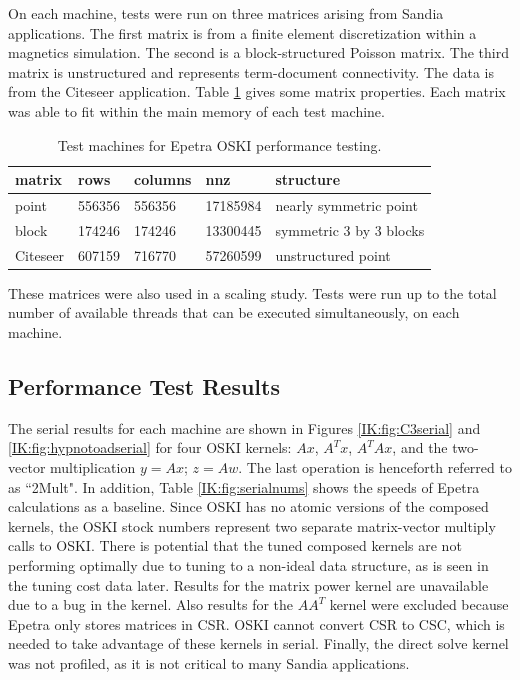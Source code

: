On each machine, tests were run on three matrices arising from Sandia applications.
The first matrix is from a finite element discretization within a magnetics simulation.
The second is a block-structured Poisson matrix.  The third matrix
is unstructured and represents term-document connectivity.  The data is from the Citeseer
application.
Table \ref{IK:fig:serialmats} gives some matrix properties.  Each
matrix was able to fit within the main memory of each test machine.
%
\begin{table}[htbp]
\begin{center}
\begin{tabular}{|l|l|l|l|l|}
\hline
matrix & rows & columns & nnz & structure \\
\hline
point & 556356 & 556356 & 17185984 & nearly symmetric point \\
block & 174246 & 174246 & 13300445 & symmetric 3 by 3 blocks \\
Citeseer & 607159 & 716770 & 57260599 & unstructured point \\
\hline
\end{tabular}
\caption{Test machines for Epetra OSKI performance testing.}
\label{IK:fig:serialmats}
\end{center}
\end{table}
%
These matrices were also used in a scaling study.   Tests were run up to the total
number of available threads that can be executed simultaneously, on each machine.

\subsection{Performance Test Results}

The serial results for each machine are shown in
Figures \ref{IK:fig:C3serial} and \ref{IK:fig:hypnotoadserial} for four OSKI kernels:
$Ax$, $A^Tx$, $A^{T}Ax$, and the two-vector multiplication $y=Ax$; $z=Aw$.  The last operation is henceforth referred to as ``2Mult".
In addition, Table \ref{IK:fig:serialnums} shows the speeds of Epetra calculations as a baseline.
Since OSKI has no atomic versions of the composed kernels, the OSKI stock numbers
represent two separate matrix-vector multiply calls to OSKI.  There is potential that
the tuned composed kernels are not performing optimally due to tuning to a non-ideal data structure,
as is seen in the tuning cost data later.  Results for the matrix power kernel are unavailable
due to a bug in the kernel.  Also results for the $AA^T$ kernel were excluded because Epetra only
stores matrices in CSR. OSKI cannot convert CSR to CSC, which is needed to take advantage
of these kernels in serial.  Finally, the direct solve kernel was not profiled, as it is not
critical to many Sandia applications.

